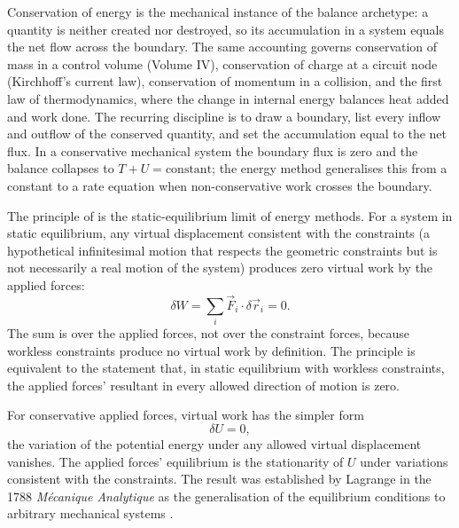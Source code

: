 \begin{archetype}[Balance]
Conservation of energy is the mechanical instance of the balance
archetype: a quantity is neither created nor destroyed, so its
accumulation in a system equals the net flow across the boundary. The
same accounting governs conservation of mass in a control volume
(Volume IV), conservation of charge at a circuit node (Kirchhoff's
current law), conservation of momentum in a collision, and the first
law of thermodynamics, where the change in internal energy balances heat
added and work done. The recurring discipline is to draw a boundary,
list every inflow and outflow of the conserved quantity, and set the
accumulation equal to the net flux. In a conservative mechanical system
the boundary flux is zero and the balance collapses to $T + U =
\text{constant}$; the energy method generalises this from a constant to
a rate equation when non-conservative work crosses the boundary.
\end{archetype}

The principle of  is the static-equilibrium
limit of energy methods. For a system in static equilibrium, any
virtual displacement consistent with the constraints (a hypothetical
infinitesimal motion that respects the geometric constraints but is
not necessarily a real motion of the system) produces zero virtual
work by the applied forces:
\[
\delta W = \sum_i \vec{F}_i \cdot \delta \vec{r}_i = 0.
\]
The sum is over the applied forces, not over the constraint forces,
because workless constraints produce no virtual work by definition.
The principle is equivalent to the statement that, in static
equilibrium with workless constraints, the applied forces' resultant
in every allowed direction of motion is zero.

For conservative applied forces, virtual work has the simpler form
\[
\delta U = 0,
\]
the variation of the potential energy under any allowed virtual
displacement vanishes. The applied forces' equilibrium is the
stationarity of $U$ under variations consistent with the constraints.
The result was established by Lagrange in the 1788 \emph{M\'ecanique
Analytique} as the generalisation of the equilibrium conditions to
arbitrary mechanical systems \cite{hist:lagrange1788}.

